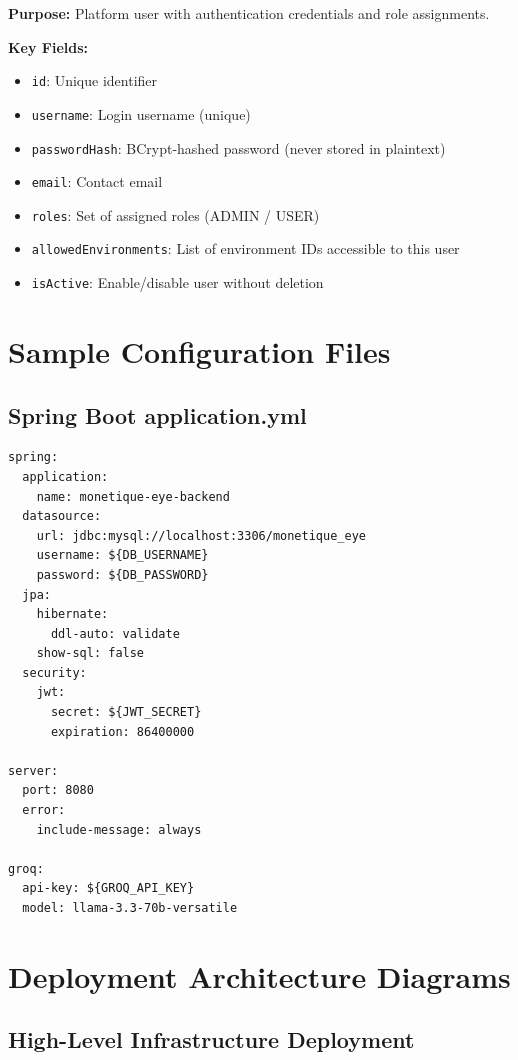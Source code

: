\documentclass[12pt,a4paper]{report}
\begin{document}
\begin{tcolorbox}
  \textbf{Purpose:} Platform user with authentication credentials and role assignments.
  
  \textbf{Key Fields:}
  \begin{itemize}
    \item \texttt{id}: Unique identifier
    \item \texttt{username}: Login username (unique)
    \item \texttt{passwordHash}: BCrypt-hashed password (never stored in plaintext)
    \item \texttt{email}: Contact email
    \item \texttt{roles}: Set of assigned roles (ADMIN / USER)
    \item \texttt{allowedEnvironments}: List of environment IDs accessible to this user
    \item \texttt{isActive}: Enable/disable user without deletion
  \end{itemize}
\end{tcolorbox}

\chapter{Sample Configuration Files}

\section{Spring Boot application.yml}

\begin{verbatim}
spring:
  application:
    name: monetique-eye-backend
  datasource:
    url: jdbc:mysql://localhost:3306/monetique_eye
    username: ${DB_USERNAME}
    password: ${DB_PASSWORD}
  jpa:
    hibernate:
      ddl-auto: validate
    show-sql: false
  security:
    jwt:
      secret: ${JWT_SECRET}
      expiration: 86400000

server:
  port: 8080
  error:
    include-message: always

groq:
  api-key: ${GROQ_API_KEY}
  model: llama-3.3-70b-versatile
\end{verbatim}

\chapter{Deployment Architecture Diagrams}

\section{High-Level Infrastructure Deployment}
\end{document}
